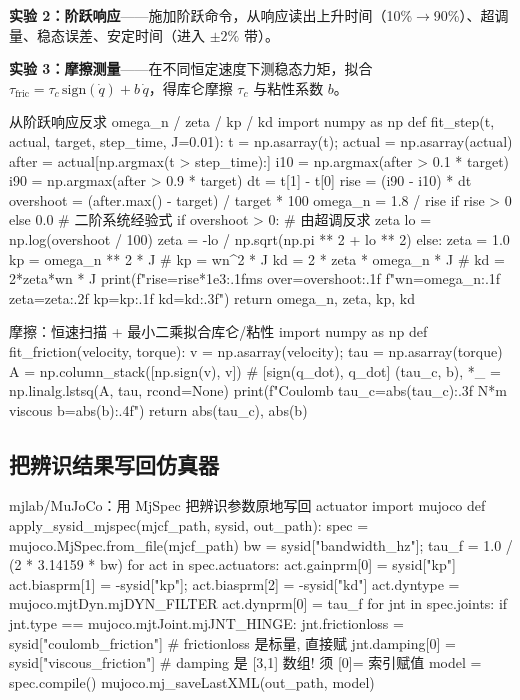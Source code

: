 \textbf{实验 2：阶跃响应}——施加阶跃命令，从响应读出上升时间（10\%$\to$90\%）、超调量、稳态误差、安定时间（进入 $\pm2\%$ 带）。

\textbf{实验 3：摩擦测量}——在不同恒定速度下测稳态力矩，拟合 $\tau_{\text{fric}}=\tau_c\,\mathrm{sign}(\dot q)+b\,\dot q$，得库仑摩擦 $\tau_c$ 与粘性系数 $b$。

\begin{codebox}[Python]{从阶跃响应反求 omega\_n / zeta / kp / kd}
import numpy as np
def fit_step(t, actual, target, step_time, J=0.01):
    t = np.asarray(t); actual = np.asarray(actual)
    after = actual[np.argmax(t > step_time):]
    i10 = np.argmax(after > 0.1 * target)
    i90 = np.argmax(after > 0.9 * target)
    dt = t[1] - t[0]
    rise = (i90 - i10) * dt
    overshoot = (after.max() - target) / target * 100
    omega_n = 1.8 / rise if rise > 0 else 0.0          # 二阶系统经验式
    if overshoot > 0:                                   # 由超调反求 zeta
        lo = np.log(overshoot / 100)
        zeta = -lo / np.sqrt(np.pi ** 2 + lo ** 2)
    else:
        zeta = 1.0
    kp = omega_n ** 2 * J                               # kp = wn^2 * J
    kd = 2 * zeta * omega_n * J                         # kd = 2*zeta*wn * J
    print(f"rise={rise*1e3:.1f}ms over={overshoot:.1f}%
          f"wn={omega_n:.1f} zeta={zeta:.2f} kp={kp:.1f} kd={kd:.3f}")
    return omega_n, zeta, kp, kd
\end{codebox}

\begin{codebox}[Python]{摩擦：恒速扫描 + 最小二乘拟合库仑/粘性}
import numpy as np
def fit_friction(velocity, torque):
    v = np.asarray(velocity); tau = np.asarray(torque)
    A = np.column_stack([np.sign(v), v])               # [sign(q_dot), q_dot]
    (tau_c, b), *_ = np.linalg.lstsq(A, tau, rcond=None)
    print(f"Coulomb tau_c={abs(tau_c):.3f} N*m  viscous b={abs(b):.4f}")
    return abs(tau_c), abs(b)
\end{codebox}

\subsection{把辨识结果写回仿真器}
\label{sec:rlmc-act-sysid-apply}

\begin{codebox}[Python]{mjlab/MuJoCo：用 MjSpec 把辨识参数原地写回 actuator}
import mujoco
def apply_sysid_mjspec(mjcf_path, sysid, out_path):
    spec = mujoco.MjSpec.from_file(mjcf_path)
    bw = sysid["bandwidth_hz"]; tau_f = 1.0 / (2 * 3.14159 * bw)
    for act in spec.actuators:
        act.gainprm[0] = sysid["kp"]
        act.biasprm[1] = -sysid["kp"]; act.biasprm[2] = -sysid["kd"]
        act.dyntype = mujoco.mjtDyn.mjDYN_FILTER
        act.dynprm[0] = tau_f
    for jnt in spec.joints:
        if jnt.type == mujoco.mjtJoint.mjJNT_HINGE:
            jnt.frictionloss = sysid["coulomb_friction"]   # frictionloss 是标量, 直接赋
            jnt.damping[0]   = sysid["viscous_friction"]   # damping 是 [3,1] 数组! 须 [0]= 索引赋值
    model = spec.compile()
    mujoco.mj_saveLastXML(out_path, model)
\end{codebox}


